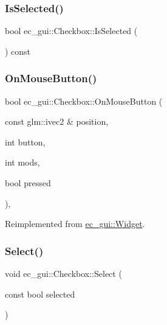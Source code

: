 \subsubsection{\texorpdfstring{Is\+Selected()}{IsSelected()}}
{\footnotesize\ttfamily bool ec\+\_\+gui\+::\+Checkbox\+::\+Is\+Selected (\begin{DoxyParamCaption}{ }\end{DoxyParamCaption}) const}

\mbox{\label{classec__gui_1_1_checkbox_a0c109bc8ddf9b272857e71cec9b63b49}} 
\subsubsection{\texorpdfstring{On\+Mouse\+Button()}{OnMouseButton()}}
{\footnotesize\ttfamily bool ec\+\_\+gui\+::\+Checkbox\+::\+On\+Mouse\+Button (\begin{DoxyParamCaption}\item[{const glm\+::ivec2 \&}]{position,  }\item[{int}]{button,  }\item[{int}]{mods,  }\item[{bool}]{pressed }\end{DoxyParamCaption})\hspace{0.3cm}{\ttfamily [override]}, {\ttfamily [virtual]}}



Reimplemented from \mbox{\hyperlink{classec__gui_1_1_widget_a00bff8173079cc1cb69ec84910715ffb}{ec\+\_\+gui\+::\+Widget}}.

\mbox{\label{classec__gui_1_1_checkbox_ac3a789d2acb2da6067f1ed4b7bd43317}} 
\subsubsection{\texorpdfstring{Select()}{Select()}}
{\footnotesize\ttfamily void ec\+\_\+gui\+::\+Checkbox\+::\+Select (\begin{DoxyParamCaption}\item[{const bool}]{selected }\end{DoxyParamCaption})\hspace{0.3cm}{\ttfamily [virtual]}}

